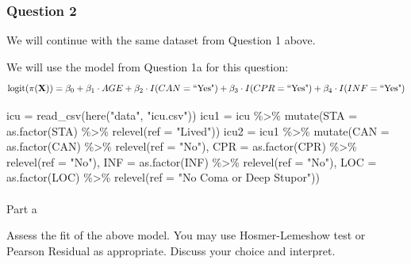 \documentclass[
  letterpaper,
  DIV=11,
  numbers=noendperiod]{scrartcl}
\makeatletter
\let\oldparagraph\paragraph
\renewcommand{\paragraph}{
    \@ifstar
      \xxxParagraphStar
      \xxxParagraphNoStar
  }
\newcommand{\xxxParagraphStar}[1]{\oldparagraph*{#1}\mbox{}}
\newcommand{\xxxParagraphNoStar}[1]{\oldparagraph{#1}\mbox{}}
\newenvironment{Shaded}{\begin{snugshade}}{\end{snugshade}}
\newcommand{\AttributeTok}[1]{\textcolor[rgb]{0.40,0.45,0.13}{#1}}
\newcommand{\FunctionTok}[1]{\textcolor[rgb]{0.28,0.35,0.67}{#1}}
\newcommand{\NormalTok}[1]{\textcolor[rgb]{0.00,0.23,0.31}{#1}}
\newcommand{\OtherTok}[1]{\textcolor[rgb]{0.00,0.23,0.31}{#1}}
\newcommand{\SpecialCharTok}[1]{\textcolor[rgb]{0.37,0.37,0.37}{#1}}
\newcommand{\StringTok}[1]{\textcolor[rgb]{0.13,0.47,0.30}{#1}}
\makeatother
\begin{document}
\subsubsection{Question 2}\label{question-2}

We will continue with the same dataset from Question 1 above.

We will use the model from Question 1a for this question:
\[\text{logit}(\pi(\textbf{X}))=\beta_0 + \beta_1 \cdot AGE + \beta_2 \cdot I(CAN=\text{``Yes"}) + \beta_3 \cdot I(CPR=\text{``Yes"}) + \\ \beta_4 \cdot I(INF=\text{``Yes"})\]

\begin{Shaded}
\begin{Highlighting}[]
\NormalTok{icu }\OtherTok{=} \FunctionTok{read\_csv}\NormalTok{(}\FunctionTok{here}\NormalTok{(}\StringTok{"data"}\NormalTok{, }\StringTok{"icu.csv"}\NormalTok{))}
\NormalTok{icu1 }\OtherTok{=}\NormalTok{ icu }\SpecialCharTok{\%\textgreater{}\%} \FunctionTok{mutate}\NormalTok{(}\AttributeTok{STA =} \FunctionTok{as.factor}\NormalTok{(STA) }\SpecialCharTok{\%\textgreater{}\%} \FunctionTok{relevel}\NormalTok{(}\AttributeTok{ref =} \StringTok{"Lived"}\NormalTok{))}
\NormalTok{icu2 }\OtherTok{=}\NormalTok{ icu1 }\SpecialCharTok{\%\textgreater{}\%} \FunctionTok{mutate}\NormalTok{(}\AttributeTok{CAN =} \FunctionTok{as.factor}\NormalTok{(CAN) }\SpecialCharTok{\%\textgreater{}\%} \FunctionTok{relevel}\NormalTok{(}\AttributeTok{ref =} \StringTok{"No"}\NormalTok{), }
                     \AttributeTok{CPR =} \FunctionTok{as.factor}\NormalTok{(CPR) }\SpecialCharTok{\%\textgreater{}\%} \FunctionTok{relevel}\NormalTok{(}\AttributeTok{ref =} \StringTok{"No"}\NormalTok{), }
                     \AttributeTok{INF =} \FunctionTok{as.factor}\NormalTok{(INF) }\SpecialCharTok{\%\textgreater{}\%} \FunctionTok{relevel}\NormalTok{(}\AttributeTok{ref =} \StringTok{"No"}\NormalTok{), }
                     \AttributeTok{LOC =} \FunctionTok{as.factor}\NormalTok{(LOC) }\SpecialCharTok{\%\textgreater{}\%} 
                       \FunctionTok{relevel}\NormalTok{(}\AttributeTok{ref =} \StringTok{"No Coma or Deep Stupor"}\NormalTok{))}
\end{Highlighting}
\end{Shaded}

\paragraph{Part a}\label{part-a-1}

Assess the fit of the above model. You may use Hosmer-Lemeshow test or
Pearson Residual as appropriate. Discuss your choice and interpret.
\end{document}
